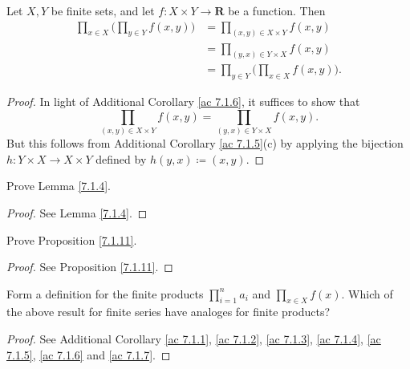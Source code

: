 \begin{additional corollary}\label{ac 7.1.7}
Let \(X, Y\) be finite sets, and let \(f : X \times Y \to \mathbf{R}\) be a function.
Then
\begin{align*}
    \prod_{x \in X} \bigg(\prod_{y \in Y} f(x, y)\bigg) & = \prod_{(x, y) \in X \times Y} f(x, y)                \\
                                                        & = \prod_{(y, x) \in Y \times X} f(x, y)                \\
                                                        & = \prod_{y \in Y} \bigg(\prod_{x \in X} f(x, y)\bigg).
\end{align*}
\end{additional corollary}

\begin{proof}
    In light of Additional Corollary \ref{ac 7.1.6}, it suffices to show that
    \[
        \prod_{(x, y) \in X \times Y} f(x, y) = \prod_{(y, x) \in Y \times X} f(x, y).
    \]
    But this follows from Additional Corollary \ref{ac 7.1.5}(c) by applying the bijection \(h : Y \times X \to X \times Y\) defined by \(h(y, x) \coloneqq (x, y)\).
\end{proof}

\exercisesection

\begin{exercise}\label{ex 7.1.1}
    Prove Lemma \ref{7.1.4}.
\end{exercise}

\begin{proof}
    See Lemma \ref{7.1.4}.
\end{proof}

\begin{exercise}\label{ex 7.1.2}
    Prove Proposition \ref{7.1.11}.
\end{exercise}

\begin{proof}
    See Proposition \ref{7.1.11}.
\end{proof}

\begin{exercise}\label{ex 7.1.3}
    Form a definition for the finite products \(\prod_{i = 1}^n a_i\) and \(\prod_{x \in X} f(x)\).
    Which of the above result for finite series have analoges for finite products?
\end{exercise}

\begin{proof}
    See Additional Corollary \ref{ac 7.1.1}, \ref{ac 7.1.2}, \ref{ac 7.1.3}, \ref{ac 7.1.4}, \ref{ac 7.1.5}, \ref{ac 7.1.6} and \ref{ac 7.1.7}.
\end{proof}

